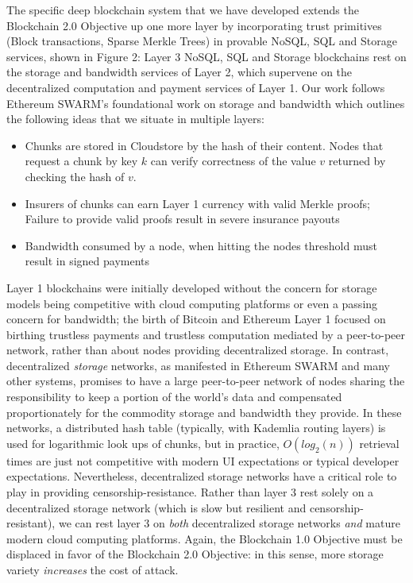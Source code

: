 \documentclass{article}
\begin{document}
The specific deep blockchain system that we have developed extends the Blockchain 2.0 Objective up one more layer by incorporating trust primitives (Block transactions, Sparse Merkle Trees) in provable NoSQL, SQL and Storage services, shown in Figure 2:  Layer 3 NoSQL, SQL and Storage blockchains rest on the storage and bandwidth services of Layer 2, which supervene on the decentralized computation and payment services of Layer 1.  Our work follows Ethereum SWARM's foundational work on storage and bandwidth \cite{swarm} which outlines the following ideas that we situate in multiple layers:
\begin{itemize}
    \item Chunks are stored in Cloudstore by the hash of their content.  Nodes that request a chunk by key $k$ can verify correctness of the value $v$ returned by checking the hash of $v$.
    \item Insurers of chunks can earn Layer 1 currency with valid Merkle proofs; Failure to provide valid proofs result in severe insurance payouts
    \item Bandwidth consumed by a node, when hitting the nodes threshold must result in signed payments
\end{itemize}
Layer 1 blockchains were initially developed without the concern for storage models being competitive with cloud computing platforms or even a passing concern for bandwidth; the birth of Bitcoin and Ethereum Layer 1 focused on birthing trustless payments and trustless computation mediated by a peer-to-peer network, rather than about nodes providing decentralized storage.   In contrast, decentralized {\em storage} networks, as manifested in Ethereum SWARM and many other systems, promises to have a large peer-to-peer network of nodes sharing the responsibility to keep a portion of the world's data and compensated proportionately for the commodity storage and bandwidth they provide.  In these networks, a distributed hash table (typically, with Kademlia routing layers) is used for logarithmic look ups of chunks, but in practice, $O(log_2(n))$ retrieval times are just not competitive with modern UI expectations or typical developer expectations.  Nevertheless, decentralized storage networks have a critical role to play in providing censorship-resistance.  Rather than layer 3 rest solely on a decentralized storage network (which is slow but resilient and censorship-resistant), we can rest layer 3 on {\em both} decentralized storage networks {\em and} mature modern cloud computing platforms.  Again, the Blockchain 1.0 Objective must be displaced in favor of the Blockchain 2.0 Objective: in this sense, more storage variety {\em increases} the cost of attack.
\end{document}
